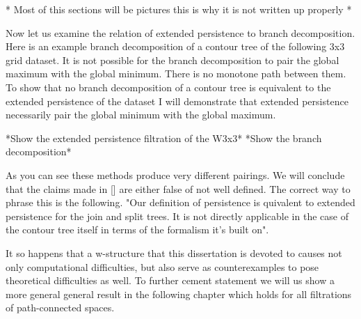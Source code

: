 * Most of this sections will be pictures this is why it is not written up properly *

Now let us examine the relation of extended persistence to branch decomposition. Here is an example branch decomposition of a contour tree of the following 3x3 grid dataset. It is not possible for the branch decomposition to pair the global maximum with the global minimum. There is no monotone path between them. To show that no branch decomposition of a contour tree is equivalent to the extended persistence of the dataset I will demonstrate that extended persistence necessarily pair the global minimum with the global maximum. 

*Show the extended persistence filtration of the W3x3*
*Show the branch decomposition*


As you can see these methods produce very different pairings. We will conclude that the claims made in [] are either false of not well defined. The correct way to phrase this is the following. "Our definition of persistence is quivalent to extended persistence for the join and split trees. It is not directly applicable in the case of the contour tree itself in terms of the formalism it's built on".


It so happens that a w-structure that this dissertation is devoted to causes not only computational difficulties, but also serve as counterexamples to pose theoretical difficulties as well. To further cement statement we will us show a more general general result in the following chapter which holds for all filtrations of path-connected spaces.






